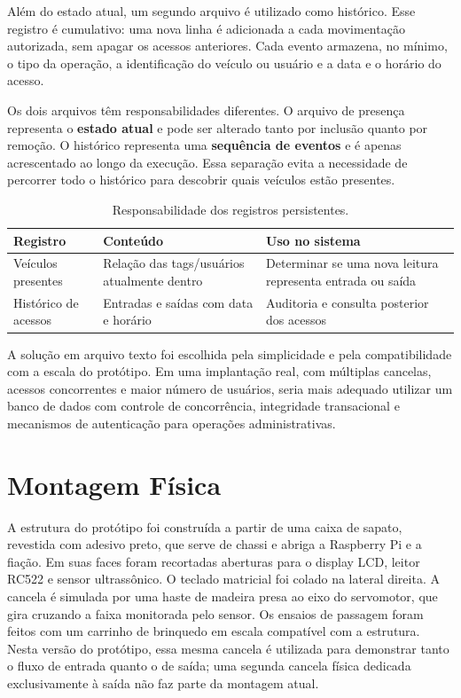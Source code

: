 \documentclass[11pt,a4paper]{article}
\begin{document}
Além do estado atual, um segundo arquivo é utilizado como histórico. Esse
registro é cumulativo: uma nova linha é adicionada a cada movimentação
autorizada, sem apagar os acessos anteriores. Cada evento armazena, no mínimo, o
tipo da operação, a identificação do veículo ou usuário e a data e o horário do
acesso.

Os dois arquivos têm responsabilidades diferentes. O arquivo de presença
representa o \textbf{estado atual} e pode ser alterado tanto por inclusão quanto
por remoção. O histórico representa uma \textbf{sequência de eventos} e é apenas
acrescentado ao longo da execução. Essa separação evita a necessidade de
percorrer todo o histórico para descobrir quais veículos estão presentes.

\begin{table}[H]
\centering
\small
\caption{Responsabilidade dos registros persistentes.}
\label{tab:persistencia}
\begin{tabular}{@{}L{4.1cm}L{5.0cm}L{5.0cm}@{}}
\toprule
\textbf{Registro} & \textbf{Conteúdo} & \textbf{Uso no sistema} \\
\midrule
Veículos presentes
& Relação das tags/usuários atualmente dentro
& Determinar se uma nova leitura representa entrada ou saída \\[4pt]
Histórico de acessos
& Entradas e saídas com data e horário
& Auditoria e consulta posterior dos acessos \\
\bottomrule
\end{tabular}
\end{table}

A solução em arquivo texto foi escolhida pela simplicidade e pela compatibilidade
com a escala do protótipo. Em uma implantação real, com múltiplas cancelas,
acessos concorrentes e maior número de usuários, seria mais adequado utilizar um
banco de dados com controle de concorrência, integridade transacional e
mecanismos de autenticação para operações administrativas.

\section{Montagem Física}

A estrutura do protótipo foi construída a partir de uma caixa de sapato,
revestida com adesivo preto, que serve de chassi e abriga a Raspberry Pi e a fiação. Em suas faces foram recortadas aberturas para o display LCD,
leitor RC522 e sensor ultrassônico. O teclado matricial foi colado na lateral direita. A cancela é simulada por uma haste de madeira presa ao eixo do servomotor, que gira cruzando a faixa monitorada pelo sensor.
Os ensaios de passagem foram feitos com um carrinho de brinquedo em escala
compatível com a estrutura. Nesta versão do protótipo, essa mesma cancela é
utilizada para demonstrar tanto o fluxo de entrada quanto o de saída; uma segunda
cancela física dedicada exclusivamente à saída não faz parte da montagem atual.
\end{document}
